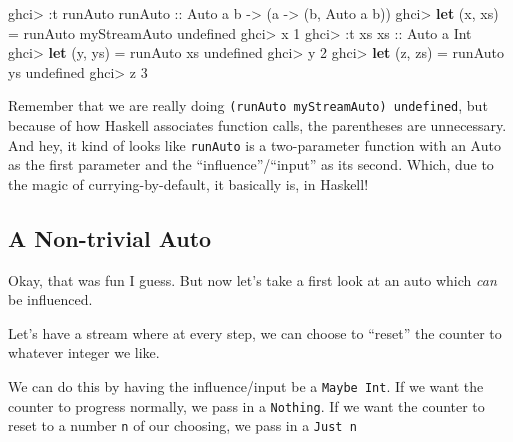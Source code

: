 \documentclass[]{article}
\newenvironment{Shaded}{}{}
\newcommand{\DataTypeTok}[1]{\textcolor[rgb]{0.56,0.13,0.00}{#1}}
\newcommand{\DecValTok}[1]{\textcolor[rgb]{0.25,0.63,0.44}{#1}}
\newcommand{\FunctionTok}[1]{\textcolor[rgb]{0.02,0.16,0.49}{#1}}
\newcommand{\KeywordTok}[1]{\textcolor[rgb]{0.00,0.44,0.13}{\textbf{#1}}}
\newcommand{\NormalTok}[1]{#1}
\newcommand{\OperatorTok}[1]{\textcolor[rgb]{0.40,0.40,0.40}{#1}}
\newcommand{\OtherTok}[1]{\textcolor[rgb]{0.00,0.44,0.13}{#1}}
\begin{document}
\begin{Shaded}
\begin{Highlighting}[]
\NormalTok{ghci}\OperatorTok{\textgreater{}} \OperatorTok{:}\NormalTok{t runAuto}
\OtherTok{runAuto ::} \DataTypeTok{Auto}\NormalTok{ a b }\OtherTok{{-}\textgreater{}}\NormalTok{ (a }\OtherTok{{-}\textgreater{}}\NormalTok{ (b, }\DataTypeTok{Auto}\NormalTok{ a b))}
\NormalTok{ghci}\OperatorTok{\textgreater{}} \KeywordTok{let}\NormalTok{ (x, xs) }\OtherTok{=}\NormalTok{ runAuto myStreamAuto }\FunctionTok{undefined}
\NormalTok{ghci}\OperatorTok{\textgreater{}}\NormalTok{ x}
\DecValTok{1}
\NormalTok{ghci}\OperatorTok{\textgreater{}} \OperatorTok{:}\NormalTok{t xs}
\OtherTok{xs ::} \DataTypeTok{Auto}\NormalTok{ a }\DataTypeTok{Int}
\NormalTok{ghci}\OperatorTok{\textgreater{}} \KeywordTok{let}\NormalTok{ (y, ys) }\OtherTok{=}\NormalTok{ runAuto xs }\FunctionTok{undefined}
\NormalTok{ghci}\OperatorTok{\textgreater{}}\NormalTok{ y}
\DecValTok{2}
\NormalTok{ghci}\OperatorTok{\textgreater{}} \KeywordTok{let}\NormalTok{ (z, zs) }\OtherTok{=}\NormalTok{ runAuto ys }\FunctionTok{undefined}
\NormalTok{ghci}\OperatorTok{\textgreater{}}\NormalTok{ z}
\DecValTok{3}
\end{Highlighting}
\end{Shaded}

Remember that we are really doing \texttt{(runAuto\ myStreamAuto)\ undefined},
but because of how Haskell associates function calls, the parentheses are
unnecessary. And hey, it kind of looks like \texttt{runAuto} is a two-parameter
function with an Auto as the first parameter and the ``influence''/``input'' as
its second. Which, due to the magic of currying-by-default, it basically is, in
Haskell!

\subsection{A Non-trivial Auto}\label{a-non-trivial-auto}

Okay, that was fun I guess. But now let's take a first look at an auto which
\emph{can} be influenced.

Let's have a stream where at every step, we can choose to ``reset'' the counter
to whatever integer we like.

We can do this by having the influence/input be a \texttt{Maybe\ Int}. If we
want the counter to progress normally, we pass in a \texttt{Nothing}. If we want
the counter to reset to a number \texttt{n} of our choosing, we pass in a
\texttt{Just\ n}
\end{document}
